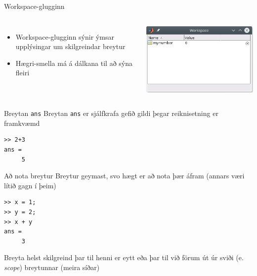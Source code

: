 \documentclass{beamer}
\begin{document}
\begin{frame}{Workspace-glugginn}
\begin{columns}
\begin{itemize}
 \item Workspace-glugginn sýnir ýmsar upplýsingar um skilgreindar breytur
 \item Hægri-smella má á dálkana til að sýna fleiri
\end{itemize}
\includegraphics[width=\linewidth]{Pics/workspace-window}
\end{columns}
\end{frame}

\begin{frame}[fragile]{Breytan \texttt{ans}}
Breytan \texttt{ans} er sjálfkrafa gefið gildi þegar reiknisetning er framkvæmd 
\begin{verbatim}
>> 2+3
ans = 
     5
\end{verbatim}
\end{frame}

\begin{frame}[fragile]{Að nota breytur}
Breytur geymast, svo hægt er að nota þær áfram (annars væri lítið gagn í þeim)
\begin{verbatim}
>> x = 1;
>> y = 2;
>> x + y
ans =
     3
\end{verbatim}
Breyta helst skilgreind þar til henni er eytt eða þar til við förum út úr sviði (e. \emph{scope}) breytunnar (meira síðar)
\end{frame}
\end{document}
